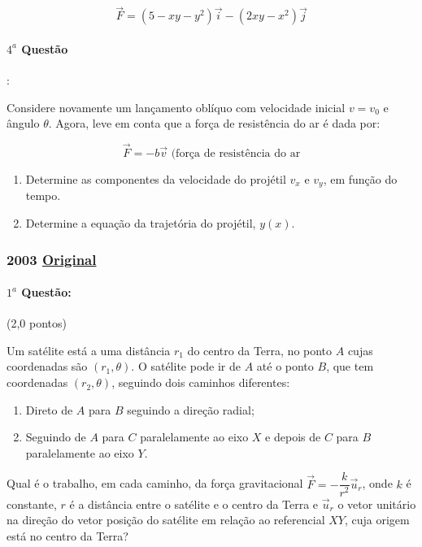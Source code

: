 \documentclass[12pt,a4paper]{article}
\newcommand{\original}[1]{\tiny \href{#1}{Original} \normalsize}
\begin{document}
$$ \overrightarrow{F}= (5-xy-y^2)\overrightarrow{i}-(2xy-x^2)\overrightarrow{j}$$

\paragraph{$4^a$ Questão}:

Considere novamente um lançamento oblíquo com velocidade inicial $v=v_0$ e ângulo $\theta$. Agora, leve em conta que a força de resistência do ar é dada por:

$$ \overrightarrow{F}=-b\overrightarrow{v} \textrm{ (força de resistência do ar} $$

\begin{enumerate}[label=\alph*)]
\item Determine as componentes da velocidade do projétil $v_x$ e $v_y$, em função do tempo.
\item Determine a equação da trajetória do projétil, $y(x)$.
\end{enumerate}
\newpage

\subsubsection{2003 \original{https://drive.google.com/file/d/1DHYVV8VAxas7WYdZjn7KfkgFQ6bv0rQq/view?usp=sharing}}

\paragraph{$1^a$ Questão:} (2,0 pontos)

Um satélite está a uma distância $r_1$ do centro da Terra, no ponto $A$ cujas coordenadas são $(r_1,\theta)$. O satélite
pode ir de $A$ até o ponto $B$, que tem coordenadas $(r_2,\theta)$, seguindo dois caminhos diferentes:
\begin{enumerate}[label=\roman*)]
\item Direto de $A$ para $B$ seguindo a direção radial;
\item Seguindo de $A$ para $C$ paralelamente ao eixo $X$ e depois de $C$ para $B$ paralelamente ao eixo $Y$.  
\end{enumerate}
Qual é o trabalho, em cada caminho, da força gravitacional $\overrightarrow{F}=-\dfrac{k}{r^2}\overrightarrow{u}_r$, onde 
$k$ é constante, $r$ é a distância entre o satélite e o centro da Terra e $\overrightarrow{u}_r$ o vetor unitário na direção 
do vetor posição do satélite em relação ao referencial $XY$, cuja origem está no centro da Terra?
\end{document}
